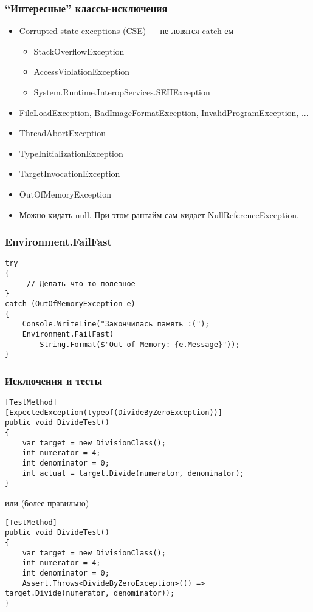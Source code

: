 \documentclass[xetex,mathserif,serif]{beamer}
\begin{document}
    \begin{frame}
        \frametitle{``Интересные'' классы-исключения}
        \begin{itemize}
            \item Corrupted state exceptions (CSE) --- не ловятся catch-ем
            \begin{itemize}
                \item StackOverflowException
                \item AccessViolationException
                \item System.Runtime.InteropServices.SEHException
            \end{itemize}
            \item FileLoadException, BadImageFormatException, InvalidProgramException, ...
            \item ThreadAbortException
            \item TypeInitializationException
            \item TargetInvocationException
            \item OutOfMemoryException
            \item Можно кидать null. При этом рантайм сам кидает NullReferenceException.
        \end{itemize}
    \end{frame}

    \begin{frame}[fragile]
        \frametitle{Environment.FailFast}
        \begin{verbatim}
try 
{
     // Делать что-то полезное
}
catch (OutOfMemoryException e) 
{
    Console.WriteLine("Закончилась память :(");
    Environment.FailFast(
        String.Format($"Out of Memory: {e.Message}"));
}
        \end{verbatim}
    \end{frame}

    \begin{frame}[fragile]
        \frametitle{Исключения и тесты}
        \begin{footnotesize}
            \begin{verbatim}
[TestMethod]
[ExpectedException(typeof(DivideByZeroException))]
public void DivideTest()
{
    var target = new DivisionClass();
    int numerator = 4;
    int denominator = 0;
    int actual = target.Divide(numerator, denominator);
}
            \end{verbatim}
        \end{footnotesize}
        или (более правильно)
        \begin{footnotesize}
            \begin{verbatim}
[TestMethod]
public void DivideTest()
{
    var target = new DivisionClass();
    int numerator = 4;
    int denominator = 0;
    Assert.Throws<DivideByZeroException>(() => target.Divide(numerator, denominator));
}
            \end{verbatim}
        \end{footnotesize}
    \end{frame}
\end{document}

